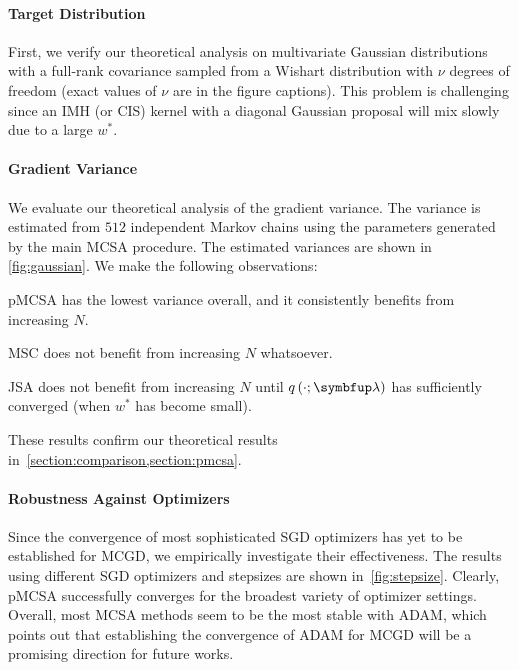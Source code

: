 \paragraph{Target Distribution}
First, we verify our theoretical analysis on multivariate Gaussian distributions with a full-rank covariance sampled from a Wishart distribution with \(\nu\) degrees of freedom (exact values of \(\nu\) are in the figure captions).
This problem is challenging since an IMH (or CIS) kernel with a diagonal Gaussian proposal will mix slowly due to a large \(w^*\).

\vspace{-0.1in}
\paragraph{Gradient Variance}
We evaluate our theoretical analysis of the gradient variance.
The variance is estimated from \(512\) independent Markov chains using the parameters generated by the main MCSA procedure.
The estimated variances are shown in \cref{fig:gaussian}.
We make the following observations:
\begin{enumerate*}[label=\textbf{(\roman*)}]
  \item pMCSA has the lowest variance overall, and it consistently benefits from increasing \(N\).
  \item MSC does not benefit from increasing \(N\) whatsoever.
  \item JSA does not benefit from increasing \(N\) until \(q\left(\cdot; \vlambda\right)\) has sufficiently converged (when \(w^*\) has become small).
\end{enumerate*}
These results confirm our theoretical results in~\cref{section:comparison,section:pmcsa}.

\vspace{-0.1in}
\paragraph{Robustness Against Optimizers}
Since the convergence of most sophisticated SGD optimizers has yet to be established for MCGD, we empirically investigate their effectiveness.
The results using different SGD optimizers and stepsizes are shown in~\cref{fig:stepsize}.
Clearly, pMCSA successfully converges for the broadest variety of optimizer settings.
Overall, most MCSA methods seem to be the most stable with ADAM, which points out that establishing the convergence of ADAM for MCGD will be a promising direction for future works.


